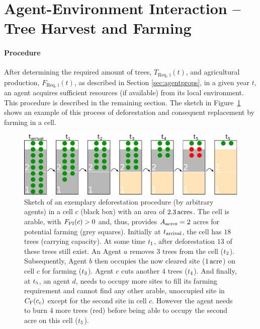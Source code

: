 \section{Agent-Environment Interaction -- Tree Harvest and Farming} \label{sec:Harvest}
\paragraph{Procedure}
After determining the required amount of trees, $T_\text{Req, i}(t)$, and agricultural production, $F_\text{Req, i}(t)$, as described in Section \ref{sec:agentprops}, in a given year $t$, an agent acquires sufficient resources (if available) from its local environment.
This procedure is described in the remaining section. 
The sketch in Figure~\ref{fig:treeburning} shows an example of this process of deforestation and consequent replacement by farming in a cell.
\begin{figure}
	\centering
	\includegraphics[width=\textwidth]{images/SketchABM2/burningSketch.pdf}
	\caption{Sketch of an exemplary deforestation procedure (by arbitrary agents) in a cell $c$ (black box) with an area of $2.3\, \rm{acres}$.
		The cell is arable, with $F_{\rm PI}(c)>0$ and, thus, provides $A_{\rm acres}=2$ acres for potential farming (grey squares).
		Initially at $t_{\rm arrival}$, the cell has $18$ trees (carrying capacity).
		At some time $t_{\rm 1}$, after deforestation $13$ of these trees still exist. 
		An Agent $a$ removes $3$ trees from the cell (\ra $t_{\rm 2}$). 
		Subsequently, Agent $b$ then occupies the now cleared site ($1\, {\rm acre}$) on cell $c$ for farming (\ra $t_{\rm 3}$). 
		Agent $c$ cuts another $4$ trees (\ra $t_{\rm 4}$).
		And finally, at $t_{\rm 5}$, an agent $d$, needs to occupy more sites to fill its farming requirement and cannot find any other arable, unoccupied site in $C_{\rm F}(c_c)$ except for the second site in cell $c$. 
		However the agent needs to burn $4$ more trees (red) before being able to occupy the second acre on this cell (\ra $t_{\rm 5}$).}
	\label{fig:treeburning}
\end{figure}

